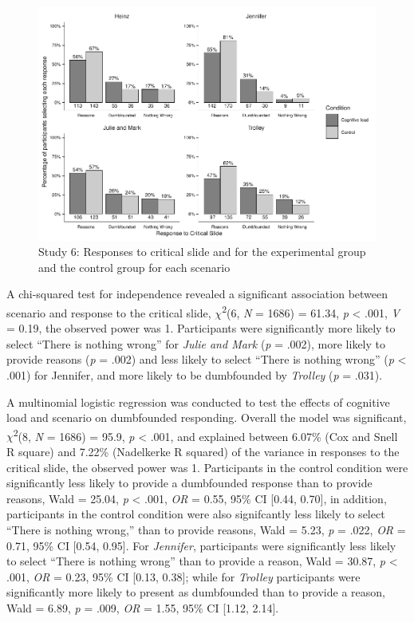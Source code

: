 \documentclass[
  american,
  man,floatsintext]{apa7}
\begin{document}
\begin{figure}
\centering
\includegraphics{cog_load_in_chunks_files/figure-latex/S6ch5S6fig2criticalconditionb-1.pdf}
\caption{\label{fig:S6ch5S6fig2criticalconditionb}Study 6: Responses to critical slide and for the experimental group and the control group for each scenario}
\end{figure}

A chi-squared test for independence revealed a significant association between scenario and response to the critical slide, \(\chi\)\textsuperscript{2}(6, \emph{N} = 1686) = 61.34, \emph{p} \textless{} .001, \emph{V} = 0.19, the observed power was 1. Participants were significantly more likely to select ``There is nothing wrong'' for \emph{Julie and Mark} (\emph{p} = .002), more likely to provide reasons (\emph{p} = .002) and less likely to select ``There is nothing wrong'' (\emph{p} \textless{} .001) for Jennifer, and more likely to be dumbfounded by \emph{Trolley} (\emph{p} = .031).

A multinomial logistic regression was conducted to test the effects of cognitive load and scenario on dumbfounded responding. Overall the model was significant, \(\chi\)\textsuperscript{2}(8, \emph{N} = 1686) = 95.9, \emph{p} \textless{} .001, and explained between 6.07\% (Cox and Snell R square) and 7.22\% (Nadelkerke R squared) of the variance in responses to the critical slide, the observed power was 1. Participants in the control condition were significantly less likely to provide a dumbfounded response than to provide reasons, Wald = 25.04, \emph{p} \textless{} .001, \emph{OR} = 0.55, 95\% CI {[}0.44, 0.70{]}, in addition, participants in the control condition were also signifcantly less likely to select ``There is nothing wrong,'' than to provide reasons, Wald = 5.23, \emph{p} = .022, \emph{OR} = 0.71, 95\% CI {[}0.54, 0.95{]}. For \emph{Jennifer}, participants were significantly less likely to select ``There is nothing wrong'' than to provide a reason, Wald = 30.87, \emph{p} \textless{} .001, \emph{OR} = 0.23, 95\% CI {[}0.13, 0.38{]}; while for \emph{Trolley} participants were significantly more likely to present as dumbfounded than to provide a reason, Wald = 6.89, \emph{p} = .009, \emph{OR} = 1.55, 95\% CI {[}1.12, 2.14{]}.
\end{document}
